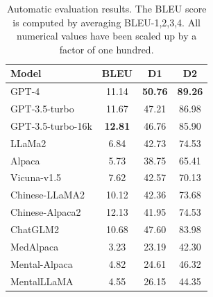 

\begin{table}[htbp]
\centering
\footnotesize
\begin{tabular}{l c c c}
\hline
\textbf{Model} & \textbf{BLEU} & \textbf{D1} & \textbf{D2}\\
\hline
GPT-4 & 11.14 & \textbf{50.76} & \textbf{89.26}\\
GPT-3.5-turbo & 11.67 & 47.21 & 86.98\\
GPT-3.5-turbo-16k & \textbf{12.81} & 46.76 & 85.90\\
\hline
LLaMa2 & 6.84 & 42.73 & 74.53\\
Alpaca & 5.73 & 38.75 & 65.41\\
Vicuna-v1.5 & 7.62 & 42.57 & 70.13\\
\hline
Chinese-LLaMA2 & 10.12 & 42.36 & 73.68\\
Chinese-Alpaca2 & 12.13 & 41.95 & 74.53\\
ChatGLM2 & 10.68 & 47.60 & 83.98\\
\hline
MedAlpaca & 3.23 & 23.19 & 42.30\\
Mental-Alpaca & 4.82 & 24.61 & 46.32\\
MentalLLaMA & 4.55 & 26.15 & 44.35\\
\hline
\end{tabular}
\caption{Automatic evaluation results. The BLEU score is computed by averaging BLEU-1,2,3,4. All numerical values have been scaled up by a factor of one hundred.}
\label{tab: automatic evaluation results}
\end{table}

